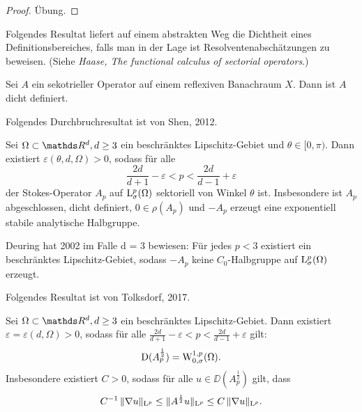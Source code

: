 \begin{proof}
  Übung.
\end{proof}

Folgendes Resultat liefert auf einem abstrakten Weg die Dichtheit eines Definitionsbereiches, falls man in der Lage ist Resolventenabschätzungen zu beweisen.  (Siehe \emph{Haase, The functional calculus of sectorial operators}.)

\begin{thm}
  Sei $A$ ein sekotrieller Operator auf einem reflexiven Banachraum $X$.
  Dann ist $A$ dicht definiert.
\end{thm}

Folgendes Durchbruchresultat ist von Shen, 2012.

\begin{hsatz}
  Sei $\Omega \subset \R^d, d \geq 3$ ein beschränktes Lipschitz-Gebiet und $\theta \in [0,\pi)$.
    Dann existiert $\varepsilon(\theta, d, \Omega) > 0$, sodass für alle
    $$
    \frac{2d}{d + 1} - \varepsilon < p < \frac{2d}{d - 1} + \varepsilon
    $$
    der Stokes-Operator $A_p$ auf $\mathrm{L}_\sigma^p(\Omega)$ sektoriell von Winkel $\theta$ ist.
    Insbesondere ist $A_p$ abgeschlossen, dicht definiert, $0 \in \rho(A_p)$ und  $-A_p$ erzeugt eine exponentiell stabile analytische Halbgruppe.
\end{hsatz}

\begin{rem}
  Deuring hat 2002 im Falle d = 3 bewiesen: Für jedes $p < 3$ existiert ein beschränktes Lipschitz-Gebiet, sodass $-A_p$ keine $C_0$-Halbgruppe auf $\mathrm{L}_\sigma^p(\Omega)$ erzeugt.
\end{rem}

Folgendes Resultat ist von Tolksdorf, 2017.

\begin{hsatz}
  Sei $\Omega \subset \R^d, d \geq 3$ ein beschränktes Lipschitz-Gebiet.
  Dann existiert $\varepsilon = \varepsilon(d,\Omega) > 0$, sodass für alle 
  $
  \frac{2d}{d + 1} - \varepsilon < p < \frac{2d}{d - 1} + \varepsilon
  $
  gilt:
  $$
  \mathrm{D}(A_p^{\frac{1}{2}}) = \mathrm{W}_{0,\sigma}^{1,p}(\Omega).
  $$
  Insbesondere existiert $C > 0$, sodass für alle $u \in \DD(A_p^{\frac{1}{2}})$ gilt, dass
  $$
  C^{-1} \, \|\nabla u\|_{\mathrm{L}^p} \leq \| A^{\frac{1}{2}} u\|_{\mathrm{L}^p} \leq C \, \|\nabla u\|_{\mathrm{L}^p}.
  $$
\end{hsatz}
